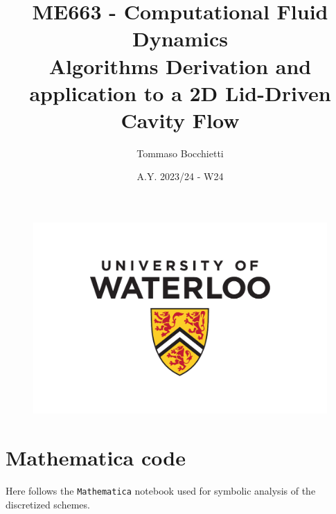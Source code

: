 \documentclass{assignment}
\begin{document}
\graphicspath{{./img/}}


\title{ME663 - Computational Fluid Dynamics \\ Algorithms Derivation and application to a 2D Lid-Driven Cavity Flow}
\author{Tommaso Bocchietti}
\date{A.Y. 2023/24 - W24}

\maketitle

\begin{figure}[H]
    \centering
    \includegraphics[width=.9\textwidth]{./pdf/UniversityOfWaterloo_logo_vert_pms}
    \label{fig:University_Of_Waterloo_logo}
\end{figure}

\clearpage
\tableofcontents
\listoffigures
\listoftables
\lstlistoflistings

\clearpage
% 
% 







\clearpage



\clearpage
\appendix
\label{sec:appendix}

\section{Mathematica code}

Here follows the \texttt{Mathematica} notebook used for symbolic analysis of the discretized schemes.


\end{document}
